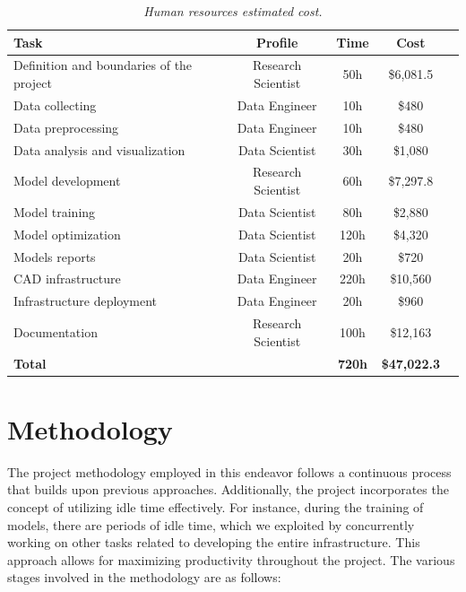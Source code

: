 \newpage

\begin{table}[H]
  \centering
  \begin{tabular}{lcccc}
    \toprule
    \textbf{Task} & \textbf{Profile} & \textbf{Time} & \textbf{Cost} \\
    \midrule
    Definition and boundaries of the project & Research Scientist & 50h & \$6,081.5\\
    Data collecting & Data Engineer & 10h & \$480\\
    Data preprocessing & Data Engineer & 10h & \$480 \\
    Data analysis and visualization & Data Scientist & 30h & \$1,080\\
    Model development & Research Scientist & 60h & \$7,297.8 \\
    Model training & Data Scientist & 80h & \$2,880 \\
    Model optimization & Data Scientist & 120h & \$4,320 \\
    Models reports & Data Scientist & 20h & \$720 \\
    CAD infrastructure & Data Engineer & 220h & \$10,560 \\
    Infrastructure deployment & Data Engineer & 20h & \$960 \\
    Documentation & Research Scientist & 100h & \$12,163 \\
    \midrule
    \textbf{Total} &    &  \textbf{720h} & \textbf{\$47,022.3} \\
    \bottomrule
  \end{tabular}
  \caption[Human resources estimated cost]
  {\textit{Human resources estimated cost. }}
  {\label{table:human_resources_cost}}
\end{table}


\section{Methodology}

The project methodology employed in this endeavor follows a continuous process
that builds upon previous approaches. Additionally, the project incorporates
the concept of utilizing idle time effectively. For instance, during the
training of models, there are periods of idle time, which we exploited by
concurrently working on other tasks related to developing the entire
infrastructure. This approach allows for maximizing productivity throughout the
project. The various stages involved in the methodology are as follows: \\


